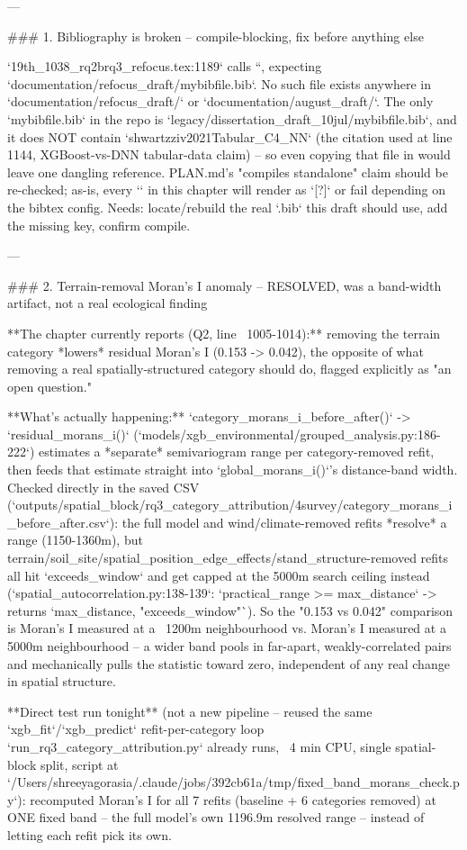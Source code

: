 ---

### 1. Bibliography is broken -- compile-blocking, fix before anything else

`19th_1038_rq2brq3_refocus.tex:1189` calls ``, expecting
`documentation/refocus_draft/mybibfile.bib`. No such file exists anywhere in
`documentation/refocus_draft/` or `documentation/august_draft/`. The only `mybibfile.bib` in the
repo is `legacy/dissertation_draft_10jul/mybibfile.bib`, and it does NOT contain
`shwartzziv2021Tabular_C4_NN` (the citation used at line 1144, XGBoost-vs-DNN tabular-data
claim) -- so even copying that file in would leave one dangling reference. PLAN.md's "compiles
standalone" claim should be re-checked; as-is, every `\cite{}` in this chapter will render as
`[?]` or fail depending on the bibtex config. Needs: locate/rebuild the real `.bib` this draft
should use, add the missing key, confirm compile.

---

### 2. Terrain-removal Moran's I anomaly -- RESOLVED, was a band-width artifact, not a real ecological finding

**The chapter currently reports (Q2, line ~1005-1014):** removing the terrain category
*lowers* residual Moran's I (0.153 -> 0.042), the opposite of what removing a real
spatially-structured category should do, flagged explicitly as "an open question."

**What's actually happening:** `category_morans_i_before_after()` -> `residual_morans_i()`
(`models/xgb_environmental/grouped_analysis.py:186-222`) estimates a *separate* semivariogram
range per category-removed refit, then feeds that estimate straight into
`global_morans_i()`'s distance-band width. Checked directly in the saved CSV
(`outputs/spatial_block/rq3_category_attribution/4survey/category_morans_i_before_after.csv`):
the full model and wind/climate-removed refits *resolve* a range (1150-1360m), but
terrain/soil_site/spatial_position_edge_effects/stand_structure-removed refits all hit
`exceeds_window` and get capped at the 5000m search ceiling instead
(`spatial_autocorrelation.py:138-139`: `practical_range >= max_distance` -> returns
`max_distance, "exceeds_window"`). So the "0.153 vs 0.042" comparison is Moran's I measured at a
~1200m neighbourhood vs. Moran's I measured at a 5000m neighbourhood -- a wider band pools in
far-apart, weakly-correlated pairs and mechanically pulls the statistic toward zero, independent
of any real change in spatial structure.

**Direct test run tonight** (not a new pipeline -- reused the same `xgb_fit`/`xgb_predict`
refit-per-category loop `run_rq3_category_attribution.py` already runs, ~4 min CPU, single
spatial-block split, script at
`/Users/shreeyagorasia/.claude/jobs/392cb61a/tmp/fixed_band_morans_check.py`): recomputed Moran's
I for all 7 refits (baseline + 6 categories removed) at ONE fixed band -- the full model's own
1196.9m resolved range -- instead of letting each refit pick its own.

